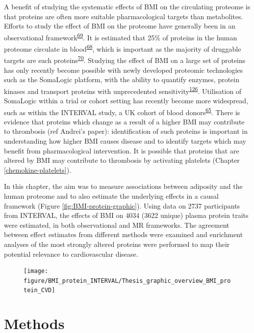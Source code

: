 \documentclass[11pt,twoside]{bristolthesis}
\begin{document}
A benefit of studying the systematic effects of BMI on the circulating proteome is that proteins are often more suitable pharmacological targets than metabolites. Efforts to study the effect of BMI on the proteome have generally been in an observational framework\textsuperscript{\protect\hyperlink{ref-Cominetti2018}{69}}. It is estimated that 25\% of proteins in the human proteome circulate in blood\textsuperscript{\protect\hyperlink{ref-Gold2012}{68}}, which is important as the majority of druggable targets are such proteins\textsuperscript{\protect\hyperlink{ref-Imming2006}{70}}. Studying the effect of BMI on a large set of proteins has only recently become possible with newly developed proteomic technologies such as the SomaLogic platform, with the ability to quantify enzymes, protein kinases and transport proteins with unprecedented sensitivity\textsuperscript{\protect\hyperlink{ref-Rohloff2014}{126}}. Utilisation of SomaLogic within a trial or cohort setting has recently become more widespread, such as within the INTERVAL study, a UK cohort of blood donors\textsuperscript{\protect\hyperlink{ref-Sun2018}{65}}. There is evidence that proteins which change as a result of a higher BMI may contribute to thrombosis (ref Andrei's paper): identification of such proteins is important in understanding how higher BMI causes disease and to identify targets which may benefit from pharmacological intervention. It is possible that proteins that are altered by BMI may contribute to thrombosis by activating platelets (Chapter \ref{chemokine-platelets}).

In this chapter, the aim was to measure associations between adiposity and the human proteome and to also estimate the underlying effects in a causal framework (Figure \ref{fig:BMI-protein-graphic}). Using data on 2737 participants from INTERVAL, the effects of BMI on 4034 (3622 unique) plasma protein traits were estimated, in both observational and MR frameworks. The agreement between effect estimates from different methods were examined and enrichment analyses of the most strongly altered proteins were performed to map their potential relevance to cardiovascular disease.



\begin{figure}
\texttt{[image: figure/BMI\_protein\_INTERVAL/Thesis\_graphic\_overview\_BMI\_protein\_CVD]} \end{figure}

\hypertarget{methods-2}{%
\section{Methods}\label{methods-2}}
\end{document}
